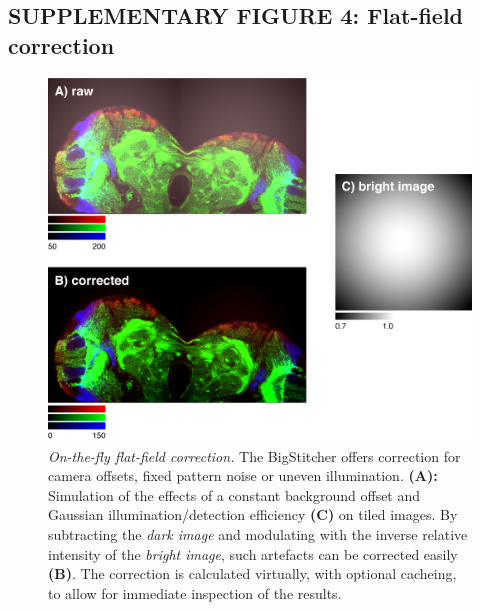 \documentclass[]{spie}  %
\begin{document}
\subsection*{SUPPLEMENTARY FIGURE 4: Flat-field correction}
\vspace{1mm}
\begin{figure}[h!]
\includegraphics[width=\textwidth]{fig-flatfield.png}
\vspace{-2.0mm}
\caption{\hspace{-0.5mm} \emph{On-the-fly flat-field correction.} The BigStitcher offers correction for camera offsets, fixed pattern noise or uneven illumination. \textbf{(A):}  Simulation of the effects of a constant background offset and Gaussian illumination/detection efficiency \textbf{(C)} on tiled images. By subtracting the \emph{dark image} and modulating with the inverse relative intensity of the \emph{bright image}, such artefacts can be corrected easily \textbf{(B)}. The correction is calculated virtually, with optional cacheing, to allow for immediate inspection of the results.
}
\label{fig:sup-fig-flatfield}
\end{figure}

\pagebreak
\end{document}
